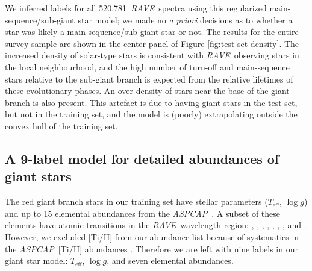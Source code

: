 \documentclass[preprint]{aastex61}
\newcommand{\acronym}[1]{{\small{#1}}}
\newcommand{\project}[1]{\textsl{#1}}
\newcommand{\rave}{\project{\acronym{RAVE}}}
\newcommand{\aspcap}{\project{\acronym{ASPCAP}}}
\newcommand{\teff}{T_{\mathrm{eff}}}
\newcommand{\logg}{\log g}
\newcommand{\Nspectra}{520,781}
\begin{document}
We inferred labels for all \Nspectra\ \rave\ spectra using this regularized main-sequence/sub-giant
star model; we made no \emph{a priori} decisions as to whether a star was likely a
main-sequence/sub-giant star or not.  The results for the entire survey sample are shown
in the center panel of Figure \ref{fig:test-set-density}.  The increased density of 
solar-type stars is consistent with \rave\ observing stars in the local neighbourhood, 
and the high number of turn-off and main-sequence stars relative to the sub-giant branch 
is expected from the relative lifetimes of these evolutionary phases.  An over-density
of stars near the base of the giant branch is also present.  This artefact is due 
to having giant stars in the test set, but not in the training set, and the model is 
(poorly) extrapolating outside the convex hull of the training set.


\subsection{A 9-label model for detailed abundances of giant stars}
\label{sec:evolved-star-model}


The red giant branch stars in our training set have stellar parameters 
($\teff$, $\logg$) and up to 15 elemental abundances from the \aspcap\ 
\citep{Garcia_Perez_2016}.  A subset of these elements have atomic transitions in the 
\rave\ wavelength region: \ion{O}{1}, \ion{Mg}{1}, \ion{Al}{1}, \ion{Si}{1}, 
\ion{Ca}{2}, \ion{Ti}{1}, \ion{Fe}{1}, and \ion{Ni}{1}.  However, we 
excluded [Ti/H] from our abundance list because of systematics in the \aspcap\
[Ti/H] abundances \citep{Holtzman_2015,Hawkins_2016}.  Therefore we are left 
with nine labels in our giant star model: $\teff$, $\logg$, and seven elemental 
abundances.  
\end{document}
